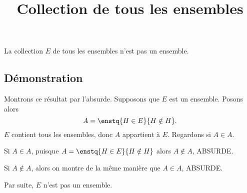 \documentclass[fontsize=12pt,twoside=false,parskip=half, french]{scrartcl}
\title{Collection de tous les ensembles}
\date{}
\author{}
\begin{document}
\maketitle
   \begin{Theoreme}
      La collection $E$ de tous les ensembles n’est pas un ensemble.
   \end{Theoreme}
   \subsection{Démonstration}
      Montrons ce résultat par l’absurde. Supposons que $E$ est un ensemble.
      Posons alors
      \[
         A = \enstq{H \in E}{H \notin H}.
      \]
      $E$ contient tous les ensembles, donc $A$ appartient à $E$. Regardons si $A \in A$.
      \begin{description}
         \item Si $A \in A$, puisque $A = \enstq{H \in E}{H \notin H}$ alors  $A \not \in A$, ABSURDE.
         \item Si $A \not \in A$, alors on montre de la même manière que $A \in A$, ABSURDE.
      \end{description}
      Par suite, $E$ n’est pas un ensemble.
\end{document}
